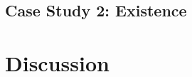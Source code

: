 











\subsection{Case Study 2: Existence} \label{sec:auditing:case-studies:existence}





 







\section{Discussion} \label{sec:auditing:discussion}

